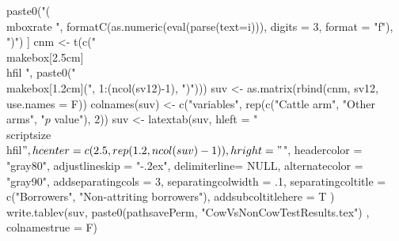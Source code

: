 \begin{Schunk}
\begin{Sinput}
    paste0("(\\mbox{rate }", formatC(as.numeric(eval(parse(text=i))), digits = 3, format = "f"), ")") ]
cnm <- t(c("\\makebox[2.5cm]{\\hfil }", 
  paste0("\\makebox[1.2cm]{(", 1:(ncol(sv12)-1), ")}")))
suv <- as.matrix(rbind(cnm, sv12, use.names = F))
colnames(suv) <- c("variables", rep(c("Cattle arm", "Other arms", "$p$ value"), 2))
suv <- latextab(suv, 
  hleft = "\\scriptsize\\hfil$", 
  hcenter = c(2.5, rep(1.2, ncol(suv)-1)), 
  hright = "$", 
  headercolor = "gray80", adjustlineskip = "-.2ex", delimiterline= NULL,
  alternatecolor = "gray90",
  addseparatingcols = 3, 
  separatingcolwidth = .1, 
  separatingcoltitle = c("Borrowers", "Non-attriting borrowers"),
  addsubcoltitlehere = T
  )
write.tablev(suv,  
  paste0(pathsavePerm, "CowVsNonCowTestResults.tex")
, colnamestrue = F)
\end{Sinput}
\end{Schunk}

